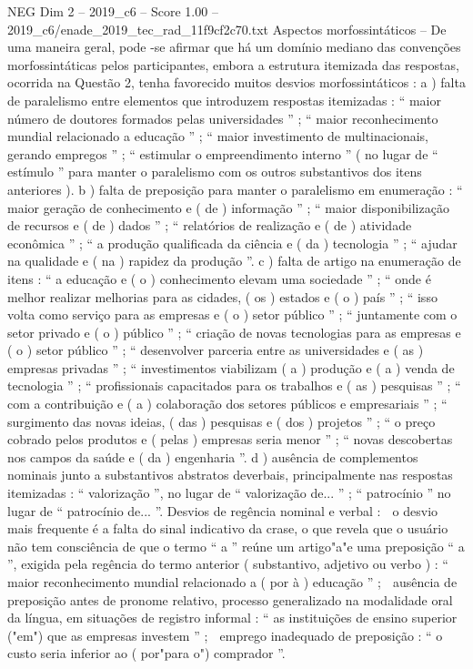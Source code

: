 \begin{textsample}{NEG Dim 2 – 2019\_c6 – Score 1.00 – 2019\_c6/enade\_2019\_tec\_rad\_11f9cf2c70.txt}
Aspectos morfossintáticos – De uma maneira geral, pode -se afirmar que há um domínio mediano das convenções morfossintáticas pelos participantes, embora a estrutura itemizada das respostas, ocorrida na Questão 2, tenha favorecido muitos desvios morfossintáticos : a ) falta de paralelismo entre elementos que introduzem respostas itemizadas : “ maior número de doutores formados pelas universidades ” ; “ maior reconhecimento mundial relacionado a educação ” ; “ maior investimento de multinacionais, gerando empregos ” ; “ estimular o empreendimento interno ” ( no lugar de “ estímulo ” para manter o paralelismo com os outros substantivos dos itens anteriores ). b ) falta de preposição para manter o paralelismo em enumeração : “ maior geração de conhecimento e ( de ) informação ” ; “ maior disponibilização de recursos e ( de ) dados ” ; “ relatórios de realização e ( de ) atividade econômica ” ; “ a produção qualificada da ciência e ( da ) tecnologia ” ; “ ajudar na qualidade e ( na ) rapidez da produção ”. c ) falta de artigo na enumeração de itens : “ a educação e ( o ) conhecimento elevam uma sociedade ” ; “ onde é melhor realizar melhorias para as cidades, ( os ) estados e ( o ) país ” ; “ isso volta como serviço para as empresas e ( o ) setor público ” ; “ juntamente com o setor privado e ( o ) público ” ; “ criação de novas tecnologias para as empresas e ( o ) setor público ” ; “ desenvolver parceria entre as universidades e ( as ) empresas privadas ” ; “ investimentos viabilizam ( a ) produção e ( a ) venda de tecnologia ” ; “ profissionais capacitados para os trabalhos e ( as ) pesquisas ” ; “ com a contribuição e ( a ) colaboração dos setores públicos e empresariais ” ; “ surgimento das novas ideias, ( das ) pesquisas e ( dos ) projetos ” ; “ o preço cobrado pelos produtos e ( pelas ) empresas seria menor ” ; “ novas descobertas nos campos da saúde e ( da ) engenharia ”. d ) ausência de complementos nominais junto a substantivos abstratos deverbais, principalmente nas respostas itemizadas : “ valorização ”, no lugar de “ valorização de... ” ; “ patrocínio ” no lugar de “ patrocínio de... ”.
Desvios de regência nominal e verbal :  o desvio mais frequente é a falta do sinal indicativo da crase, o que revela que o usuário não tem consciência de que o termo “ a ” reúne um artigo"a"e uma preposição “ a ”, exigida pela regência do termo anterior ( substantivo, adjetivo ou verbo ) : “ maior reconhecimento mundial relacionado a ( por à ) educação ” ;  ausência de preposição antes de pronome relativo, processo generalizado na modalidade oral da língua, em situações de registro informal : “ as instituições de ensino superior ("em") que as empresas investem ” ;  emprego inadequado de preposição : “ o custo seria inferior ao ( por"para o") comprador ”.

\end{textsample}
